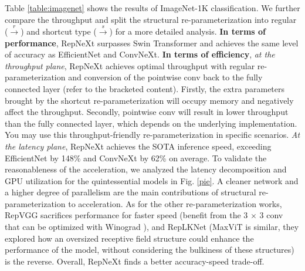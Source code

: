 \documentclass[preprint,12pt]{elsarticle}
\begin{document}
Table \ref{table:imagenet} shows the results of ImageNet-1K classification. We further compare the throughput and split the structural re-parameterization into regular ($\stackrel{r}{\rightarrow}$) and shortcut type ($\stackrel{s}{\rightarrow}$) for a more detailed analysis. \textbf{In terms of performance}, RepNeXt surpasses Swin Transformer and achieves the same level of accuracy as EfficientNet and ConvNeXt. \textbf{In terms of efficiency}, \textit{at the throughput plane}, RepNeXt achieves optimal throughput with regular re-parameterization and conversion of the pointwise conv back to the fully connected layer (refer to the bracketed content). Firstly, the extra parameters brought by the shortcut re-parameterization will occupy memory and negatively affect the throughput. Secondly, pointwise conv will result in lower throughput than the fully connected layer, which depends on the underlying implementation. You may use this throughput-friendly re-parameterization in specific scenarios. \textit{At the latency plane}, RepNeXt achieves the SOTA inference speed, exceeding EfficientNet by 148\% and ConvNeXt by 62\% on average. To validate the reasonableness of the acceleration, we analyzed the latency decomposition and GPU utilization for the quintessential models in Fig. \ref{pie}. A cleaner network and a higher degree of parallelism are the main contributions of structural re-parameterization to acceleration. As for the other re-parameterization works, RepVGG sacrifices performance for faster speed (benefit from the 3 $\times$ 3 conv that can be optimized with Winograd \cite{winograd}), and RepLKNet (MaxViT is similar, they explored how an oversized receptive field structure could enhance the performance of the model, without considering the bulkiness of these structures) is the reverse. Overall, RepNeXt finds a better accuracy-speed trade-off.
\end{document}
